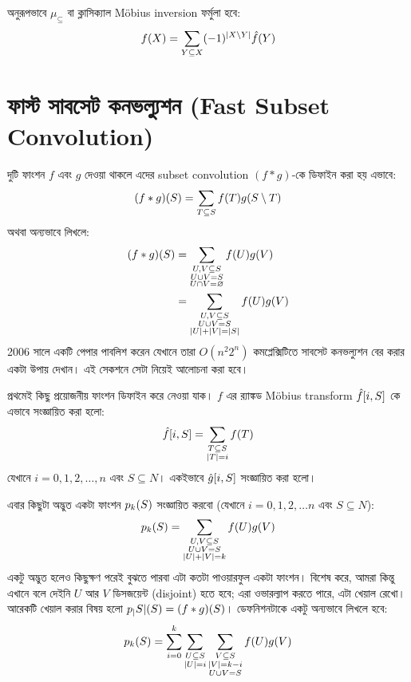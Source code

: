 অনুরূপভাবে $\mu_\subseteq$ বা
ক্লাসিক্যাল M{\"o}bius inversion ফর্মুলা হবে:
\[
  f(X) = \sum_{Y \subseteq X} (-1)^{\left| X \setminus Y \right|} \hat{f}(Y)
\]

\section{ফাস্ট সাবসেট কনভল্যুশন (Fast Subset Convolution)}
দুটি ফাংশন $f$ এবং $g$ দেওয়া থাকলে এদের subset convolution $(f * g)$-কে
ডিফাইন করা হয় এভাবে:
\[
  (f*g)(S) = \sum_{T \subseteq S} f(T)g(S \setminus T)
\]
অথবা অন্যভাবে লিখলে:
\begin{align*}
  (f * g)(S) &= \sum_{\substack{U,V \subseteq S \\ U \cup V = S \\ U \cap
  V = \varnothing}} f(U) g(V)\\
  &= \sum_{\substack{U,V \subseteq S \\ U \cup V = S \\ |U| + |V| = |S|}}
  f(U) g(V)
\end{align*}
2006 সালে \citet{10.1145/1250790.1250801} একটি পেপার পাবলিশ করেন যেখানে
তারা $O(n^2 2^n)$ কমপ্লেক্সিটিতে সাবসেট কনভল্যুশন বের করার একটা উপায় দেখান।
এই সেকশনে সেটা নিয়েই আলোচনা করা হবে।

প্রথমেই কিছু প্রয়োজনীয় ফাংশন ডিফাইন করে নেওয়া যাক। $f$ এর র‍্যাঙ্কড
M{\"o}bius transform $\hat{f}[i, S]$ কে এভাবে সংজ্ঞায়িত
করা হলো:
\[
  \hat{f}[i, S] = \sum_{\substack{T \subseteq S\\|T|=i}} f(T)
\]
যেখানে $i = 0, 1, 2, \ldots, n$ এবং $S \subseteq N$। একইভাবে
$\hat{g}[i, S]$ সংজ্ঞায়িত করা হলো।

এবার কিছুটা অদ্ভুত একটা ফাংশন $p_k(S)$ সংজ্ঞায়িত করবো (যেখানে $i =
0,1,2,\ldots n$ এবং $S \subseteq N$):
\[
  p_k(S) = \sum_{\substack{U, V \subseteq S\\U \cup V = S\\|U| + |V| =
  k}} f(U) g(V)
\]
একটু অদ্ভুত হলেও কিছুক্ষণ পরেই বুঝতে পারবা এটা কতটা পাওয়ারফুল একটা ফাংশন।
বিশেষ করে, আমরা কিন্তু এখানে বলে দেইনি $U$ আর $V$ ডিসজয়েন্ট (disjoint) হতে
হবে; এরা ওভারল্যাপ করতে পারে, এটা খেয়াল রেখো। আরেকটি খেয়াল করার বিষয় হলো
$p_|S|(S) = (f*g)(S)$। ডেফনিশনটাকে একটু অন্যভাবে
লিখলে হবে:
\[
  p_k(S) = \sum_{i=0}^{k} \sum_{\substack{U \subseteq S\\|U|=i}} \sum_{\substack{V \subseteq S\\|V|=k-i\\U \cup V = S}} f(U) g(V)
\]

